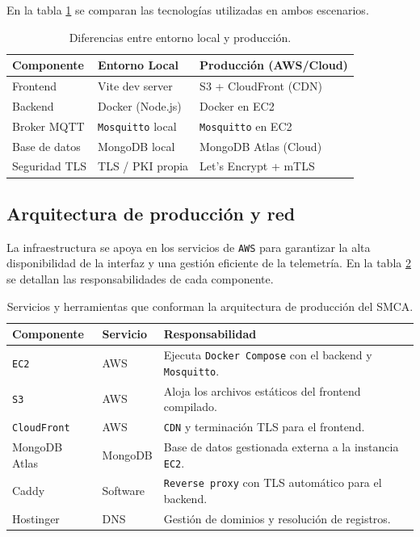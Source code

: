 En la tabla \ref{tab:entornos-despliegue} se comparan las tecnologías utilizadas en ambos escenarios.

\begin{table}[h]
    \centering
    \caption[Comparativa de entornos de despliegue]{Diferencias entre entorno local y producción.}
    \label{tab:entornos-despliegue}
    \begin{tabular}{p{3.5cm} p{4cm} p{4.5cm}}
        \toprule
        \textbf{Componente} & \textbf{Entorno Local} & \textbf{Producción (AWS/Cloud)} \\
        \midrule
        Frontend & Vite dev server & S3 + CloudFront (CDN) \\
        Backend & Docker (Node.js) & Docker en EC2 \\
        Broker MQTT & \texttt{Mosquitto} local & \texttt{Mosquitto} en EC2 \\
        Base de datos & MongoDB local & MongoDB Atlas (Cloud) \\
        Seguridad TLS & TLS / PKI propia & Let's Encrypt + mTLS \\
        \bottomrule
    \end{tabular}
\end{table}

\subsection{Arquitectura de producción y red}

La infraestructura se apoya en los servicios de \texttt{AWS} para garantizar la alta disponibilidad de la interfaz y una gestión eficiente de la telemetría. En la tabla \ref{tab:servidores-servicios} se detallan las responsabilidades de cada componente.

\begin{table}[h]
    \centering
    \caption[Componentes de infraestructura y servicios]{Servicios y herramientas que conforman la arquitectura de producción del SMCA.}
    \label{tab:servidores-servicios}
    \begin{tabular}{p{3.5cm} p{3.5cm} p{5.5cm}}
        \toprule
        \textbf{Componente} & \textbf{Servicio} & \textbf{Responsabilidad} \\
        \midrule
        \texttt{EC2} & AWS & Ejecuta \texttt{Docker Compose} con el backend y \texttt{Mosquitto}. \\
        \texttt{S3} & AWS & Aloja los archivos estáticos del frontend compilado. \\
        \texttt{CloudFront} & AWS & \texttt{CDN} y terminación TLS para el frontend. \\
        MongoDB Atlas & MongoDB & Base de datos gestionada externa a la instancia \texttt{EC2}. \\
        Caddy & Software & \texttt{Reverse proxy} con TLS automático para el backend. \\
        Hostinger & DNS & Gestión de dominios y resolución de registros. \\
        \bottomrule
    \end{tabular}
\end{table}

